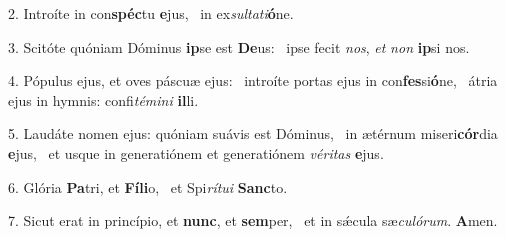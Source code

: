 2. Introíte in con\textbf{spéc}tu \textbf{e}jus, \ast\  in ex\textit{sul}\textit{ta}\textit{ti}\textbf{ó}ne.\

3. Scitóte quóniam Dóminus \textbf{ip}se est \textbf{De}us: \ast\  ipse fecit \textit{nos}, \textit{et} \textit{non} \textbf{ip}si nos.\

4. Pópulus ejus, et oves páscuæ ejus: \dag\  introíte portas ejus in con\textbf{fes}si\textbf{ó}ne, \ast\  átria ejus in hymnis: confi\textit{té}\textit{mi}\textit{ni} \textbf{il}li.\

5. Laudáte nomen ejus: quóniam suávis est Dóminus, \dag\  in ætérnum miseri\textbf{cór}dia \textbf{e}jus, \ast\  et usque in generatiónem et generatiónem \textit{vé}\textit{ri}\textit{tas} \textbf{e}jus.\

6. Glória \textbf{Pa}tri, et \textbf{Fí}\textbf{li}o, \ast\  et Spi\textit{rí}\textit{tu}\textit{i} \textbf{Sanc}to.\

7. Sicut erat in princípio, et \textbf{nunc}, et \textbf{sem}per, \ast\  et in sǽcula sæ\textit{cu}\textit{ló}\textit{rum}. \textbf{A}men.\

